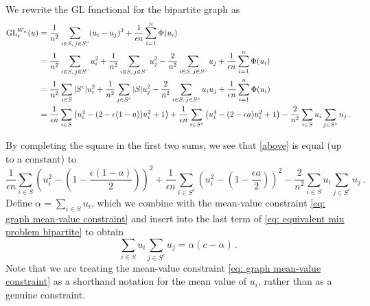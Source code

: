 \documentclass[11pt]{amsart}
\def\ep{\epsilon}
\def\GL{\operatorname{GL}}
\numberwithin{equation}{section}
\begin{document}
{We rewrite the GL functional for the bipartite graph as 
\begin{align}\label{above}
    \GL^{W_n}_\ep(u) &= \frac{1}{n^2} \sum_{\substack{i\in S  , \, j\in S^c}} (u_i - u_j)^2 + \frac{1}{\ep n} \sum_{i=1}^n \Phi(u_i)   \\
     		&= \frac{1}{n^2} \sum_{\substack{i\in S , \, j\in S^c}} u_i^2
     			+ \frac{1}{n^2} \sum_{\substack{i\in S  , \, j\in S^c}} u_j^2 - \frac{2}{n^2} \sum_{i\in S , \, j\in S^c} u_j
    			  + \frac{1}{\ep n} \sum_{i=1}^n \Phi(u_i)  \notag  \\
           &= \frac{1}{n^2} \sum_{i\in S}  |S^c| u_i^2 + \frac{1}{n^2} \sum_{ j\in S^c} |S| u_j^2 - \frac{2}{n^2} \sum_{i\in S , \, j\in S^c} u_i u_j
     		 + \frac{1}{\ep n} \sum_{i=1}^n \Phi(u_i)   \notag \\
    &= \frac{1}{\ep n} \sum_{i\in S} \left( u_i^4 - (2 - \ep (1 - a)) u_i^2 + 1\right) 
    		+ \frac{1}{\ep n} \sum_{i\in S^c} \left( u_i^4 - (2- \ep a) u_i^2 + 1\right)
    		- \frac{2}{n^2} \sum_{i\in S} u_i \sum_{j\in S^c}u_j\,. \notag
\end{align}

By completing the square in the first two sums, we see that \eqref{above} is equal (up to a constant) to
\begin{equation}\label{eq: equivalent min problem bipartite}
    \frac{1}{\ep n} \sum_{i\in S} \left(u_i^2 - \left(1 - \frac{\ep(1-a)}{2}\right) \right)^2 + \frac{1}{\ep n} \sum_{i\in S^c} \left(u_i^2 - \left(1- \frac{\ep a}{2}\right) \right)^2 - \frac{2}{n^2} \sum_{i\in S} u_i \sum_{j\in S^c}u_j\,.
\end{equation}
Define $\alpha = \sum_{i\in S} u_i$, which we combine with the mean-value constraint \eqref{eq: graph mean-value constraint} and insert into the last term of \eqref{eq: equivalent min problem bipartite} to obtain
\begin{equation*} 
	{\sum_{i\in S} u_i \sum_{j\in S^c} u_j} 
    = \alpha(c - \alpha) \,.
\end{equation*} 
Note that we are treating the mean-value constraint \eqref{eq: graph mean-value constraint} as a shorthand notation for the mean value of $u_i$, rather than as a genuine constraint. 

}
\end{document}
